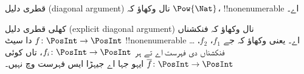 \documentclass[../../../include/open-logic-section]{subfiles}
\begin{document}
\begin{prob}
قطری دلیل (diagonal argument) نال وکھاؤ کہ $\Pow{\Nat}$،
!!{nonenumerable} اے۔
\end{prob}

\begin{prob}\label{sfr:siz:nen:prob:f-posint}
کھلی قطری دلیل (explicit diagonal argument) نال وکھاؤ کہ فنکشناں
$f \colon \PosInt \to \PosInt$
دا سیٹ !!{nonenumerable} اے۔ یعنی وکھاؤ کہ جے $f_1$، $f_2$، \dots
فنکشناں دی فہرست اے تے ہر $f_i\colon \PosInt \to \PosInt$، تاں کوئی
$\overline{f}\colon \PosInt \to \PosInt$ ایہو جہا اے جیہڑا ایس فہرست
وچ نہیں۔
\end{prob}
\end{document}
